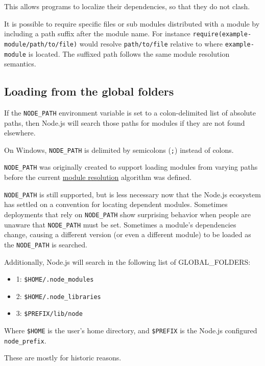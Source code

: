 This allows programs to localize their dependencies, so that they do not
clash.

It is possible to require specific files or sub modules distributed with
a module by including a path suffix after the module name. For instance
\texttt{require(\textquotesingle{}example-module/path/to/file\textquotesingle{})}
would resolve \texttt{path/to/file} relative to where
\texttt{example-module} is located. The suffixed path follows the same
module resolution semantics.

\subsection{Loading from the global
folders}\label{loading-from-the-global-folders}

If the \texttt{NODE\_PATH} environment variable is set to a
colon-delimited list of absolute paths, then Node.js will search those
paths for modules if they are not found elsewhere.

On Windows, \texttt{NODE\_PATH} is delimited by semicolons (\texttt{;})
instead of colons.

\texttt{NODE\_PATH} was originally created to support loading modules
from varying paths before the current \hyperref[all-together]{module
resolution} algorithm was defined.

\texttt{NODE\_PATH} is still supported, but is less necessary now that
the Node.js ecosystem has settled on a convention for locating dependent
modules. Sometimes deployments that rely on \texttt{NODE\_PATH} show
surprising behavior when people are unaware that \texttt{NODE\_PATH}
must be set. Sometimes a module's dependencies change, causing a
different version (or even a different module) to be loaded as the
\texttt{NODE\_PATH} is searched.

Additionally, Node.js will search in the following list of
GLOBAL\_FOLDERS:

\begin{itemize}
\tightlist
\item
  1: \texttt{\$HOME/.node\_modules}
\item
  2: \texttt{\$HOME/.node\_libraries}
\item
  3: \texttt{\$PREFIX/lib/node}
\end{itemize}

Where \texttt{\$HOME} is the user's home directory, and
\texttt{\$PREFIX} is the Node.js configured \texttt{node\_prefix}.

These are mostly for historic reasons.

